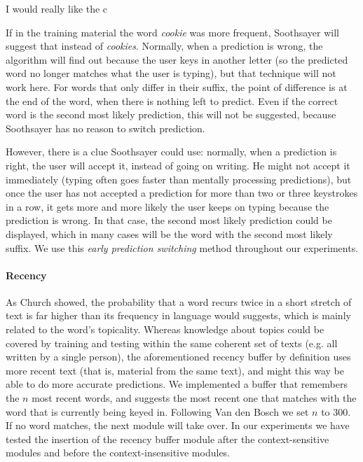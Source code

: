 \documentclass[11pt]{article}
\begin{document}
\begin{examples}
\item I would really like the c \label{morphology}
\end{examples}

If in the training material the word \emph{cookie} was more frequent, Soothsayer will suggest that instead of \emph{cookies}. Normally, when a prediction is wrong, the algorithm will find out because the user keys in another letter (so the predicted word no longer matches what the user is typing), but that technique will not work here. For words that only differ in their suffix, the point of difference is at the end of the word, when there is nothing left to predict. Even if the correct word is the second most likely prediction, this will not be suggested, because Soothsayer has no reason to switch prediction.

However, there is a clue Soothsayer could use: normally, when a prediction is right, the user will accept it, instead of going on writing. He might not accept it immediately (typing often goes faster than mentally processing predictions), but once the user has not accepted a prediction for more than two or three keystrokes in a row, it gets more and more likely the user keeps on typing because the prediction is wrong. In that case, the second most likely prediction could be displayed, which in many cases will be the word with the second most likely suffix. We use this \emph{early prediction switching} method throughout our experiments.

\paragraph{Recency} \label{rb}

As Church  showed, the probability that a word recurs twice in a short stretch of text is far higher than its  frequency in language would suggests, which is mainly related to the word's topicality. Whereas knowledge about topics could be covered by training and testing within the same coherent set of texts (e.g. all written by a single person), the aforementioned recency buffer by definition uses more recent text (that is, material from the same text), and might this way be able to do more accurate predictions. We implemented a buffer that remembers the $n$ most recent words, and suggests the most recent one that matches with the word that is currently being keyed in. Following Van den Bosch  we set $n$ to 300. If no word matches, the next module will take over. In our experiments we have tested the insertion of the recency buffer module after the context-sensitive modules and before the context-insensitive modules.
\end{document}
